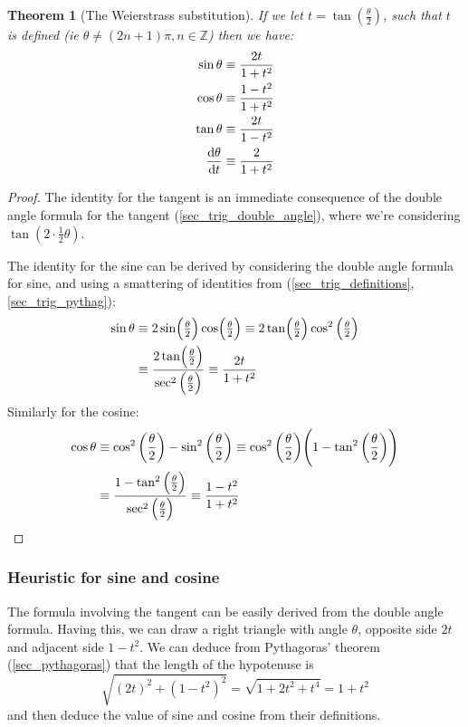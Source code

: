 \documentclass[fleqn,a4paper,11pt]{article}
\newcommand{\setstyle}{\mathbb}
\newcommand{\Integers}{\setstyle Z}
\newtheorem{theorem}{Theorem}[section]
\begin{document}
    \begin{theorem}[The Weierstrass substitution]
    If we let \(t = \tan(\frac \theta 2)\), such that \(t\) is defined (ie
    \(\theta \ne (2n + 1)\pi, n \in \Integers\)) then we have:
    \begin{align*}
    \sin \theta &\equiv \dfrac{2t}{1 + t^2} \\
    \cos \theta &\equiv \dfrac{1 - t^2}{1 + t^2} \\
    \tan \theta &\equiv \dfrac{2t}{1 - t^2} \\
    \dv{\theta}{t} &\equiv \dfrac{2}{1 + t^2}
    \end{align*}
    \end{theorem}
    \begin{proof}
    The identity for the tangent is an immediate consequence of the double
    angle formula for the tangent (\ref{sec_trig_double_angle}), where we're
    considering \(\tan(2 \cdot \frac 12 \theta)\).

    The identity for the sine can be derived by considering the double angle
    formula for sine, and using a smattering of identities from
    (\ref{sec_trig_definitions}, \ref{sec_trig_pythag}):
    \begin{align*}
    \sin \theta &\equiv 2\sin(\tfrac \theta 2)\cos(\tfrac \theta 2)
        \equiv 2\tan(\tfrac \theta 2)\cos^2\pqty{\tfrac \theta 2} \\
        &\equiv \frac{2\tan(\frac \theta 2)}{\sec^2\pqty{\frac \theta 2}}
        \equiv \frac{2t}{1 + t^2}
    \end{align*}
    Similarly for the cosine:
    \begin{align*}
    \cos \theta
        &\equiv \cos^2\pqty{\frac \theta 2} - \sin^2 \pqty{\frac \theta 2}
        \equiv \cos^2\pqty{\frac \theta 2}
            \pqty{1 - \tan^2\pqty{\frac \theta 2}} \\
        &\equiv \frac{1 - \tan^2\pqty{\frac \theta 2}}
                     {\sec^2\pqty{\frac \theta 2}}
        \equiv \frac{1 - t^2}{1 + t^2}
    \end{align*}
    \end{proof}

    \subsubsection{Heuristic for sine and cosine}


    The formula involving the tangent can be easily derived from the double
    angle formula. Having this, we can draw a right triangle with angle
    \(\theta\), opposite side \(2t\) and adjacent side \(1 - t^2\). We can
    deduce from Pythagoras' theorem (\ref{sec_pythagoras}) that the length of
    the hypotenuse is
    \begin{equation*}
    \sqrt{(2t)^2 + (1 - t^2)^2} = \sqrt{1 + 2t^2 + t^4} = 1 + t^2
    \end{equation*}
    and then deduce the value of sine and cosine from their definitions.
\end{document}
